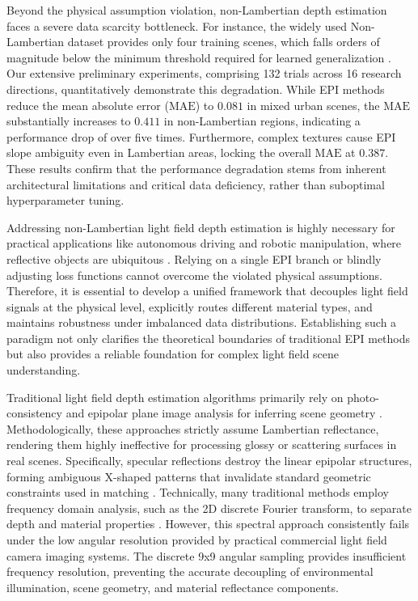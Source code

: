 \documentclass[lettersize,journal]{IEEEtran}
\begin{document}
Beyond the physical assumption violation, non-Lambertian depth estimation faces a severe data scarcity bottleneck. For instance, the widely used Non-Lambertian dataset provides only four training scenes, which falls orders of magnitude below the minimum threshold required for learned generalization \cite{nonLambertiandatasetdatasc}. Our extensive preliminary experiments, comprising 132 trials across 16 research directions, quantitatively demonstrate this degradation. While EPI methods reduce the mean absolute error ($\text{MAE}$) to $0.081$ in mixed urban scenes, the $\text{MAE}$ substantially increases to $0.411$ in non-Lambertian regions, indicating a performance drop of over five times. Furthermore, complex textures cause EPI slope ambiguity even in Lambertian areas, locking the overall $\text{MAE}$ at $0.387$. These results confirm that the performance degradation stems from inherent architectural limitations and critical data deficiency, rather than suboptimal hyperparameter tuning.

Addressing non-Lambertian light field depth estimation is highly necessary for practical applications like autonomous driving and robotic manipulation, where reflective objects are ubiquitous \cite{autonomousdrivingroboticman}. Relying on a single EPI branch or blindly adjusting loss functions cannot overcome the violated physical assumptions. Therefore, it is essential to develop a unified framework that decouples light field signals at the physical level, explicitly routes different material types, and maintains robustness under imbalanced data distributions. Establishing such a paradigm not only clarifies the theoretical boundaries of traditional EPI methods but also provides a reliable foundation for complex light field scene understanding.

Traditional light field depth estimation algorithms primarily rely on photo-consistency and epipolar plane image analysis for inferring scene geometry \cite{traditionalLFdepthEPIanaly}. Methodologically, these approaches strictly assume Lambertian reflectance, rendering them highly ineffective for processing glossy or scattering surfaces in real scenes. Specifically, specular reflections destroy the linear epipolar structures, forming ambiguous X-shaped patterns that invalidate standard geometric constraints used in matching \cite{Xshapedpatternsgeometricco}. Technically, many traditional methods employ frequency domain analysis, such as the 2D discrete Fourier transform, to separate depth and material properties \cite{2DDFTfrequencyanalysis}. However, this spectral approach consistently fails under the low angular resolution provided by practical commercial light field camera imaging systems. The discrete 9x9 angular sampling provides insufficient frequency resolution, preventing the accurate decoupling of environmental illumination, scene geometry, and material reflectance components.
\end{document}
